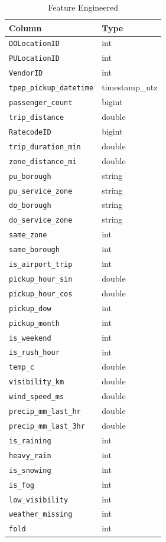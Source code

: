 \documentclass[11pt]{article}
\newcommand{\col}[1]{\texttt{#1}}
\begin{document}
\newpage

\begin{table}[H]
\centering
\caption{Feature Engineered}
\begin{tabular}{ll}
\toprule
Column & Type \\
\midrule
\col{DOLocationID}          & int \\
\col{PULocationID}          & int \\
\col{VendorID}              & int \\
\col{tpep\_pickup\_datetime}  & timestamp\_ntz \\
\col{passenger\_count}       & bigint \\
\col{trip\_distance}         & double \\
\col{RatecodeID}            & bigint \\
\col{trip\_duration\_min}     & double \\
\col{zone\_distance\_mi}      & double \\
\col{pu\_borough}            & string \\
\col{pu\_service\_zone}       & string \\
\col{do\_borough}            & string \\
\col{do\_service\_zone}       & string \\
\col{same\_zone}             & int \\
\col{same\_borough}          & int \\
\col{is\_airport\_trip}       & int \\
\col{pickup\_hour\_sin}       & double \\
\col{pickup\_hour\_cos}       & double \\
\col{pickup\_dow}            & int \\
\col{pickup\_month}          & int \\
\col{is\_weekend}            & int \\
\col{is\_rush\_hour}          & int \\
\col{temp\_c}                & double \\
\col{visibility\_km}         & double \\
\col{wind\_speed\_ms}        & double \\
\col{precip\_mm\_last\_hr}    & double \\
\col{precip\_mm\_last\_3hr}   & double \\
\col{is\_raining}            & int \\
\col{heavy\_rain}            & int \\
\col{is\_snowing}            & int \\
\col{is\_fog}                & int \\
\col{low\_visibility}        & int \\
\col{weather\_missing}       & int \\
\col{fold}                  & int \\
\bottomrule
\end{tabular}
\end{table}
\end{document}
